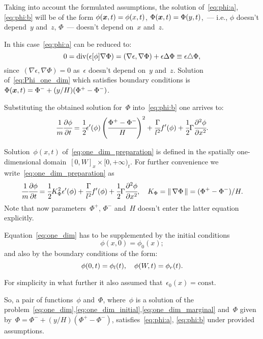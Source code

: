 Taking into account the formulated assumptions,
the solution of~\eqref{eq:phi:a},\eqref{eq:phi:b} will be of the form
$\phi({\boldsymbol{x}}, t) = \phi(x, t)$, $\Phi({\boldsymbol{x}}, t) = \Phi(y, t)$,~---
i.e.,  $\phi$ doesn't depend~$y$ and~$z$, $\Phi$~--- doesn't depend on~$x$ and~$z$.

In this case~\eqref{eq:phi:a} can be reduced to:
\begin{equation}
  0 = \operatorname{{div}}(\epsilon[\phi] \nabla \Phi) = (\nabla \epsilon, \nabla \Phi) + \epsilon \Delta \Phi \equiv  \epsilon \triangle \Phi,
  \label{eq:Phi_one_dim}
\end{equation}
since~$(\nabla \epsilon, \nabla \Phi) = 0$ as~$\epsilon$ doesn't depend on~$y$ and~$z$.
Solution of~\eqref{eq:Phi_one_dim} which satisfies boundary conditions is~$\Phi({\boldsymbol{x}}, t) = \Phi^- + (y / H)(\Phi^+ - \Phi^-)$.

Substituting the obtained solution for~$\Phi$ into~\eqref{eq:phi:b} one arrives to:
\begin{equation}
  \cfrac{1}{m} \cfrac{\partial \phi}{\partial t} = \cfrac{1}{2} \epsilon'(\phi) \left( \cfrac{\Phi^+ - \Phi^-}{H} \right)^2 + \cfrac{\Gamma}{l^2} f'(\phi) + \cfrac{1}{2} \Gamma \cfrac{\partial^2 \phi}{\partial x^2} {\text{.}}
  \label{eq:one_dim_preparation}
\end{equation}

Solution~$\phi(x, t)$ of~\eqref{eq:one_dim_preparation} is defined in
the spatially one-dimensional domain~$[0, W]_x \times [0, +\infty)_t$.
For further convenience we write~\eqref{eq:one_dim_preparation} as
\begin{equation}
  \cfrac{1}{m} \cfrac{\partial \phi}{\partial t} = \cfrac{1}{2} K_\Phi^2 \epsilon'(\phi) + \cfrac{\Gamma}{l^2} f'(\phi) + \cfrac{1}{2} \Gamma \cfrac{\partial^2 \phi}{\partial x^2},\quad
  K_\Phi = \| \, \nabla \Phi \, \| = (\Phi^+ - \Phi^-) / H. 
  \label{eq:one_dim}
\end{equation}
Note that now parameters~$\Phi^+$, $\Phi^-$ and~$H$ doesn't enter the latter equation explicitly.

Equation~\eqref{eq:one_dim} has to be supplemented by the initial conditions
\begin{equation}
	\phi(x, 0) = \phi_0(x);
	\label{eq:one_dim_initial}
\end{equation}
and also by the boundary conditions of the form:
\begin{equation}
  \phi(0, t) = \phi_l(t), \quad \phi(W, t) = \phi_r(t) {\text{.}}
  \label{eq:one_dim_marginal}
\end{equation}

For simplicity in what further it also assumed that~$\epsilon_0(x) = \text{const}$.

So, a pair of functions~$\phi$ and~$\Phi$,
where~$\phi$ is a solution of the problem~\eqref{eq:one_dim},\eqref{eq:one_dim_initial},\eqref{eq:one_dim_marginal}
and~$\Phi$ given by~$\Phi = \Phi^- + (y / H)(\Phi^+ - \Phi^-)$,
satisfies~\eqref{eq:phi:a}, \eqref{eq:phi:b} under provided assumptions.

\endinput
